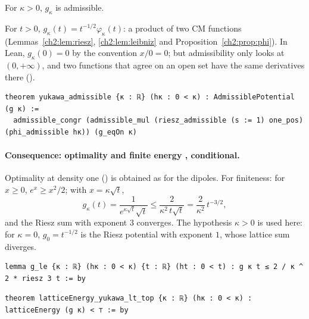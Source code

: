 \begin{theorem}\label{ch2:thm:yuk}
For $\kappa>0$, $g_\kappa$ is admissible. \tierA
\end{theorem}
\begin{humanproof}
For $t>0$, $g_\kappa(t)=t^{-1/2}\varphi_\kappa(t)$: a product of two CM functions (Lemmas~\ref{ch2:lem:riesz},
\ref{ch2:lem:leibniz} and Proposition~\ref{ch2:prop:phi}). In Lean, $g_\kappa(0)=0$ by the convention $x/0=0$; but
admissibility only looks at $(0,+\infty)$, and two functions that agree on an open set have the same derivatives there
().
\end{humanproof}
\begin{leanbox}
\begin{lstlisting}[style=chdeux]
theorem yukawa_admissible {κ : ℝ} (hκ : 0 < κ) : AdmissiblePotential (g κ) :=
  admissible_congr (admissible_mul (riesz_admissible (s := 1) one_pos) (phi_admissible hκ)) (g_eqOn κ)
\end{lstlisting}
\end{leanbox}

\paragraph{Consequence: optimality and finite energy \tierA, conditional.} Optimality at density one
() is obtained as for the dipoles. For finiteness: for $x\ge0$,
$e^x\ge x^2/2$; with $x=\kappa\sqrt t$,
\[g_\kappa(t)=\frac1{e^{\kappa\sqrt t}\sqrt t}\le\frac{2}{\kappa^2\,t\sqrt t}=\frac2{\kappa^2}\,t^{-3/2},\]
and the Riesz sum with exponent $3$ converges. The hypothesis $\kappa>0$ is used here: for $\kappa=0$, $g_0=t^{-1/2}$ is the
Riesz potential with exponent $1$, whose lattice sum diverges.
\begin{leanbox}
\begin{lstlisting}[style=chdeux]
lemma g_le {κ : ℝ} (hκ : 0 < κ) {t : ℝ} (ht : 0 < t) : g κ t ≤ 2 / κ ^ 2 * riesz 3 t := by
\end{lstlisting}
\begin{lstlisting}[style=chdeux]
theorem latticeEnergy_yukawa_lt_top {κ : ℝ} (hκ : 0 < κ) : latticeEnergy (g κ) < ⊤ := by
\end{lstlisting}
\end{leanbox}

